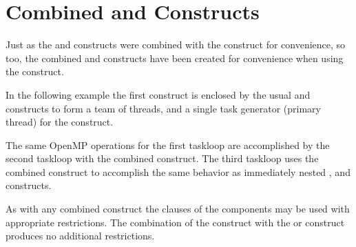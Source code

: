 \section{Combined  and  Constructs}
\label{sec:parallel_masked_taskloop}

Just as the  and  constructs were combined
with the  construct for convenience, so too, the combined
 and 
constructs have been created for convenience when using the
 construct.
  
In the following example the first  construct is enclosed
by the usual  and  constructs to form
a team of threads, and a single task generator (primary thread) for
the  construct.

The same OpenMP operations for the first taskloop are accomplished by the second
taskloop with the  
combined construct. 
The third taskloop uses the combined  
construct to accomplish the same behavior as immediately nested ,
and  constructs.

As with any combined construct the clauses of the components may be used
with appropriate restrictions. The combination of the  construct
with the  or  construct produces no additional 
restrictions.


